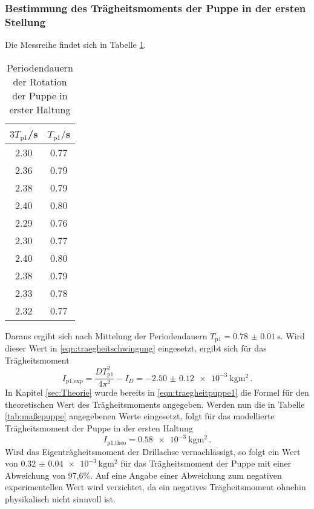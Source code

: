 \subsubsection{Bestimmung des Trägheitsmoments der Puppe in der ersten Stellung}
Die Messreihe findet sich in Tabelle \ref{tab:puppe1}.
\begin{table}
\centering
\caption{Periodendauern der Rotation der Puppe in erster Haltung}
\label{tab:puppe1}
\begin{tabular}{c c}
\toprule
$3T_{\text{p1}}$/s & $T_{\text{p1}}/$s \\
\midrule
2.30 & 0.77 \\
2.36 & 0.79 \\
2.38 & 0.79 \\
2.40 & 0.80 \\
2.29 & 0.76 \\
2.30 & 0.77 \\
2.40 & 0.80 \\
2.38 & 0.79 \\
2.33 & 0.78 \\
2.32 & 0.77 \\
\bottomrule
\end{tabular}
\end{table}

Daraus ergibt sich nach Mittelung der Periodendauern
$T_{\text{p1}}=\SI{0.78(001)}{\second}$. Wird dieser Wert in
\eqref{eqn:traegheitschwingung} eingesetzt, ergibt sich für das Trägheitsmoment
\begin{equation}
  I_{\text{p1,exp}} = \frac{DT_{\text{p1}}^2}{4\pi^2}-I_D = \SI{-2.50(012)e-3}{\kilogram\meter\squared}\,.
\end{equation}
In Kapitel \ref{sec:Theorie} wurde bereits in \eqref{eqn:traegheitpuppe1} die
Formel für den theoretischen Wert des Trägheitsmoments angegeben. Werden nun die
in Tabelle \ref{tab:maßepuppe} angegebenen Werte eingesetzt, folgt für das
modellierte Trägheitsmoment der Puppe in der ersten Haltung
\begin{equation}
  I_{\text{p1,theo}} = \SI{0.58e-3}{\kilogram\meter\squared}\,.
\end{equation}
Wird das Eigenträgheitsmoment der Drillachse vernachlässigt, so folgt ein Wert
von $\SI{0.32(004)e-3}{\kilogram\meter\squared}$ für das Trägheitsmoment der
Puppe mit einer Abweichung von 97,6\%.
Auf eine Angabe einer Abweichung zum negativen experimentellen Wert wird
verzichtet, da ein negatives Trägheitsmoment ohnehin physikalisch nicht sinnvoll
ist.
